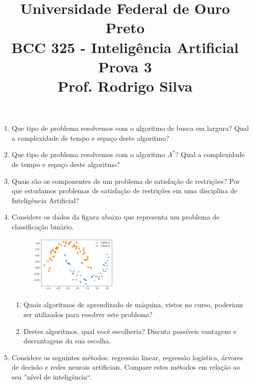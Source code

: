 \documentclass{article}
\title{\vspace{-2 cm} Universidade Federal de Ouro Preto \\ BCC 325 - Inteligência Artificial \\ Prova 3 \\ Prof. Rodrigo Silva}
\date{}
\begin{document}
\maketitle

\vspace{0.4 cm}
\begin{enumerate}

    \item Que tipo de problema resolvemos com o algoritmo de busca em largura? Qual a complexidade de tempo e espaço deste algoritmo?
    
    \item Que tipo de problema resolvemos com o algoritmo $A^*$? Qual a complexidade de tempo e espaço deste algoritmo?
    
    \item Quais são os componentes de um problema de satisfação de restrições? Por que estudamos problemas de satisfação de restrições em uma disciplina de Inteligência Artificial?
    
    \item Considere os dados da figura abaixo que representa um problema de classificação binário. 
    
        \begin{figure}[!ht]
            \centering
            \includegraphics[width=0.41\textwidth]{moons.png}
        \end{figure}
        
        \begin{enumerate}
            \item Quais algoritmos de aprendizado de máquina, vistos no curso, poderiam ser utilizados para resolver este problema?
            \item Destes algoritmos, qual você escolheria? Discuta possíveis vantagens e desvantagens da sua escolha.
        \end{enumerate}

    \item Considere os seguintes métodos: regressão linear, regressão logística, árvores de decisão e redes neurais artificiais. Compare estes métodos em relação ao seu ''nível de inteligência``. 
        

\end{enumerate}
\end{document}
